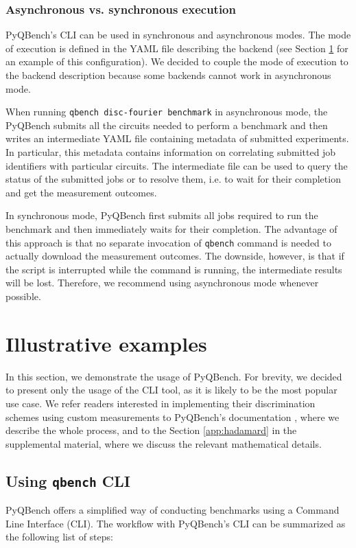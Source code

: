 \documentclass[preprint,12pt, a4paper, dvipsnames]{elsarticle}
\newcommand{\1}{{\rm 1\hspace{-0.9mm}l}}
\theoremstyle{definition}
\begin{document}
\subsubsection{Asynchronous vs. synchronous execution}
PyQBench's CLI can be used in synchronous and asynchronous modes. The mode of execution is defined
in the YAML file describing the backend (see Section \ref{sec:examples} for an example of this
configuration). We decided to couple the mode of execution to the backend description because some
backends cannot work in asynchronous mode.

When running \texttt{qbench disc-fourier benchmark} in asynchronous mode, the PyQBench submits all
the circuits needed to perform a benchmark and then writes an intermediate YAML file containing
metadata of submitted experiments. In particular, this metadata contains information on correlating
submitted job identifiers with particular circuits. The intermediate file can be used to query the
status of the submitted jobs or to resolve them, i.e. to wait for their completion and get the
measurement outcomes.

In synchronous mode, PyQBench first submits all jobs required to run the benchmark and then
immediately waits for their completion. The advantage of this approach is that no separate
invocation of \texttt{qbench} command is needed to actually download the measurement outcomes. The
downside, however, is that if the script is interrupted while the command is running, the
intermediate results will be lost. Therefore, we recommend using asynchronous mode whenever
possible.

\section{Illustrative examples}
\label{sec:examples} In this section, we demonstrate the usage of PyQBench.
For brevity, we decided to present only the usage of the CLI tool, as it is likely to be the most
popular use case. We refer readers interested in implementing their discrimination schemes using
custom measurements to PyQBench's documentation \cite{pyqbenchdocs}, where we describe the whole
process, and to the Section \ref{app:hadamard} in the supplemental material, where we discuss
the relevant mathematical details.

\subsection{Using \texttt{qbench} CLI}
PyQBench offers a simplified way of conducting benchmarks using a Command Line Interface (CLI).
The workflow with PyQBench's CLI can be summarized as the following list of steps:
\end{document}
